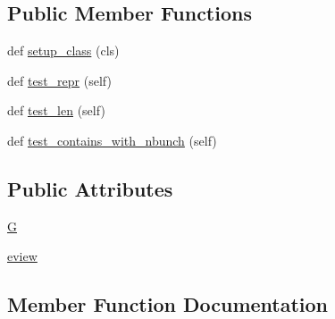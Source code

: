 \subsection*{Public Member Functions}
\begin{DoxyCompactItemize}
\item 
def \hyperlink{classnetworkx_1_1classes_1_1tests_1_1test__reportviews_1_1TestOutEdgeDataView_a9c196e59bd49adb62ea6c0deca27a6d3}{setup\+\_\+class} (cls)
\item 
def \hyperlink{classnetworkx_1_1classes_1_1tests_1_1test__reportviews_1_1TestOutEdgeDataView_a8f612b011580f56e6863ad727a882e2b}{test\+\_\+repr} (self)
\item 
def \hyperlink{classnetworkx_1_1classes_1_1tests_1_1test__reportviews_1_1TestOutEdgeDataView_a9aad7abd6a35a88790c46fc6b01b0060}{test\+\_\+len} (self)
\item 
def \hyperlink{classnetworkx_1_1classes_1_1tests_1_1test__reportviews_1_1TestOutEdgeDataView_a90ff11b178f9673502f1ca8c2f1ed1f2}{test\+\_\+contains\+\_\+with\+\_\+nbunch} (self)
\end{DoxyCompactItemize}
\subsection*{Public Attributes}
\begin{DoxyCompactItemize}
\item 
\hyperlink{classnetworkx_1_1classes_1_1tests_1_1test__reportviews_1_1TestOutEdgeDataView_a9525468c9f97291275fe02ae3fd352d1}{G}
\item 
\hyperlink{classnetworkx_1_1classes_1_1tests_1_1test__reportviews_1_1TestOutEdgeDataView_a126a85a3404a4eb431756e165326169f}{eview}
\end{DoxyCompactItemize}


\subsection{Member Function Documentation}
\mbox{\label{classnetworkx_1_1classes_1_1tests_1_1test__reportviews_1_1TestOutEdgeDataView_a9c196e59bd49adb62ea6c0deca27a6d3}} 

